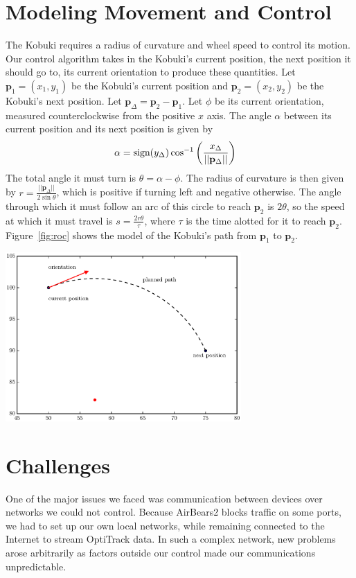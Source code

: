 \documentclass[10pt]{article}
\newenvironment{Figure}
  {\par\medskip\noindent\minipage{\linewidth}}
  {\endminipage\par\medskip}
\begin{document}
\begin{multicols*}{2}
  \section*{Modeling Movement and Control}
  The Kobuki requires a radius of curvature and wheel speed to control its
  motion. Our control algorithm takes in the Kobuki's current position, the next
  position it should go to, its current orientation to produce these quantities.
  Let $\mathbf{p}_1 = (x_1, y_1)$ be the Kobuki's current position and
  $\mathbf{p}_2 = (x_2, y_2)$ be the Kobuki's next position. Let
  $\mathbf{p}_{\Delta} = \mathbf{p}_2 - \mathbf{p}_1$. Let $\phi$ be its
  current orientation, measured counterclockwise from the positive $x$ axis. The
  angle $\alpha$ between its current position and its next position is given by
  \begin{align*}
    \alpha &= \text{sign}(y_{\Delta})
    \cos^{-1}\left(\frac{x_{\Delta}}{||\mathbf{p}_{\Delta}||}\right)
  \end{align*}
  The total angle it must turn is $\theta = \alpha - \phi$. The radius of
  curvature is then given by $r = \frac{||\mathbf{p}_{\Delta}||}{2\sin \theta}$,
  which is positive if turning left and negative otherwise. The angle through
  which it must follow an arc of this circle to reach $\mathbf{p}_2$ is $2
  \theta$, so the speed at which it must travel is $s = \frac{2r\theta}{\tau}$,
  where $\tau$ is the time alotted for it to reach $\mathbf{p}_2$.
  Figure~\ref{fig:roc} shows the model of the Kobuki's path from $\mathbf{p}_1$
  to $\mathbf{p}_2$.
  \begin{Figure}
    \includegraphics[width=9cm]{../plots/roc.eps}
     \label{fig:roc}
  \end{Figure}

  \section*{Challenges}
  One of the major issues we faced was communication between devices over
  networks we could not control. Because AirBears2 blocks traffic on some ports,
  we had to set up our own local networks, while remaining connected to the
  Internet to stream OptiTrack data. In such a complex network, new problems
  arose arbitrarily as factors outside our control made our communications
  unpredictable.


\end{multicols*}
\end{document}
